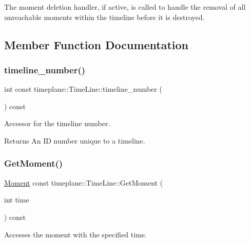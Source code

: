 The moment deletion handler, if active, is called to handle the removal of all unreachable moments within the timeline before it is destroyed. 

\subsection{Member Function Documentation}
\mbox{\label{classtimeplane_1_1_time_line_a4297da8acc6fbee73bfc7db0de2f80a5}} 
\subsubsection{\texorpdfstring{timeline\+\_\+number()}{timeline\_number()}}
{\footnotesize\ttfamily int const timeplane\+::\+Time\+Line\+::timeline\+\_\+number (\begin{DoxyParamCaption}{ }\end{DoxyParamCaption}) const\hspace{0.3cm}{\ttfamily [noexcept]}}



Accessor for the timeline number. 

\begin{DoxyReturn}{Returns}
An ID number unique to a timeline. 
\end{DoxyReturn}
\mbox{\label{classtimeplane_1_1_time_line_ae18ca86c0f036731e1bb148ed3381ea8}} 
\subsubsection{\texorpdfstring{Get\+Moment()}{GetMoment()}}
{\footnotesize\ttfamily \hyperlink{classtimeplane_1_1_moment}{Moment} const timeplane\+::\+Time\+Line\+::\+Get\+Moment (\begin{DoxyParamCaption}\item[{int}]{time }\end{DoxyParamCaption}) const}



Accesses the moment with the specified time. 


